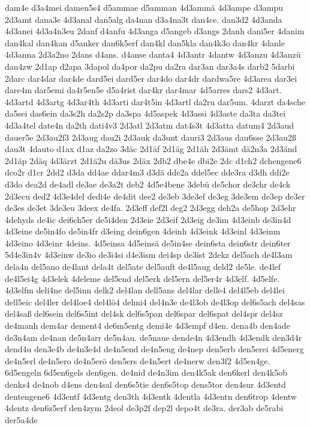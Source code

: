 {dam4e
d3a4mei
damen5s4
d5ammae
d5amman
4d3ammä
4d3ampe
d3ampu
2d3amt
dana3e
4d3anal
dan5alg
da4nan
d3a4na3t
dan4ce.
dan3d2
4d3anda
4d3anei
4d3a4n3eu
2danf
d4anfu
4d3anga
d5angeb
d3angs
2danh
dani5er
4danim
dan4kal
dan4kan
d5anker
dan6k5erf
dan4kl
dan5kla
dan4k3o
dan4kr
4danle
4d3anna
2d3a2no
2dans
d4ans.
d4anse
danta4
4d3antr
4dantw
4d3anzu
4d3anzü
dan4zw
2d1ap
d2apa
3dapol
da4por
da2pu
da2ra
dar3an
dar3a4s
darb2
5darbi
2darc
dar4dar
dar4de
dard5ei
dard5er
dar4do
dar4dr
dardwa5re
4d3area
dar3ei
dare4m
dar5emi
da4r5en5e
d5a4rist
dar4kr
dar4mar
4d5arres
dars2
4d3art.
4d3artd
4d3artg
4d3ar4th
4d3arti
dar4t5in
4d3artl
da2ru
dar5um.
4darzt
da4sche
da5sei
das6ein
da3s2h
da2s2p
da3spa
4d5aspek
4d3assi
4d3aste
da3ta
da3tei
4d3a4tel
date4n
da2th
dati4v3
2d3atl
2d3atm
dat4s3t
4d3atta
datum4
2d3aud
dauer5e
2d3au2f3
2d3aug
dau2i
2d3auk
da3unt
dauri3
2d3aus
dau6sse
2d3au2ß
dau3t
4dauto
d1ax
d1az
da2zo
3däc
2d1äf
2d1äg
2d1äh
2d3ämt
dä2n3a
2d3änd
2d1äp
2däq
4d3ärzt
2d1ä2u
dä3us
2däx
2db2
dbe4e
dbi2e
2dc
d1ch2
dchengene6
dco2r
d1cr
2dd2
d3da
dd4ae
ddar4m3
d3dä
dde2a
ddel5ec
dde3ra
d3dh
ddi2e
d3do
dea2d
de4adl
de3ae
de3a2t
deb2
4d5e4bene
3debü
de5chor
de3chr
de4ck
2d3ecu
ded2
4d3e4del
dedi4e
de4dit
dee2
de3eb
3de3ef
de3eg
3de3em
de3ep
de3er
de3es
de3et
3de3eu
3deex
de4fa.
2d3eff
def2l
deg2
2d3egg
deh2a
de5hop
2d3ehr
4dehyds
de4ic
dei6ch5er
de5i4den
2d3eie
2d3eif
2d3eig
de3im
4d3einb
de3in4d
4d3eine
de5in4fo
de5in4fr
d3eing
dein6gen
4deinh
4d3eink
4d3einl
4d3einm
4d3eino
4d3einr
4deins.
4d5einsa
4d5einsä
de5in4se
dein6sta
dein6str
dein6ter
5d4e3in4v
4d3einw
de3io
de3i4si
d4e3ism
dei4sp
de3ist
2dekz
del5ach
de4l3am
dela4n
del5ano
de4lant
dela4t
del5ate
del5auft
de4l5aug
deld2
de5le.
de4lef
de4l5ei4g
4d3elek
4deleme
del5end
del5erk
del5ern
del5er4r
4d3elf.
4d5elfe.
4d3elfm
deli4ne
del5inn
delk2
del4lan
dell5ans
del4lar
delle4
del4l5eb
del4lei
dell5eic
del4ler
del4loe4
del4lö4
delmi4
del4n3e
de4l3ob
de4l3op
del6s5ach
del4sas
del4saß
del6sein
del6s5int
del4sk
del6s5pan
del6spar
del6spat
del4spr
del4sz
de4manh
dem4ar
dement4
de6m5entg
demi4e
4d3empf
d4en.
dena4b
den4ade
de3n4am
de4nan
de5n4arr
de5n4au.
de5naue
dende4n
4d3endh
4d3endk
den3d4r
dend4u
den3e4b
de4n3e4d
de4n5end
de4n5eng
de4nep
den5erb
den5erei
4d5energ
de4n5erl
de4n5ero
de4n5erö
den5ers
de4n5ert
de4nerw
den3f2
4d5en4ge.
6d5engeln
6d5en6gels
den6gen.
de4nid
de4n3im
den4k5ak
den6kerl
den4k5ob
denks4
de4nob
d4ens
den4sal
den6s5tie
den6s5top
dens5tor
den4sur
4d3entd
dentengene6
4d3entf
4d3entg
den3th
4d3entk
4dentla
4d3entn
den6trop
4dentw
4dentz
den6z5erf
den4zym
2deol
de3p2f
dep2l
depo4t
de3ra.
der3ab
de5rabi
der5a4de
}
